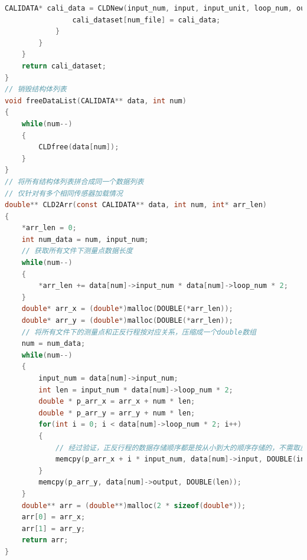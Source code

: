 \documentclass[a4paper,12pt,twoside]{article}%
\begin{document}
\begin{lstlisting}[language=C]
				CALIDATA* cali_data = CLDNew(input_num, input, input_unit, loop_num, output_unit, output);
				cali_dataset[num_file] = cali_data;
			}
		}
	}
	return cali_dataset;
}
// 销毁结构体列表
void freeDataList(CALIDATA** data, int num)
{
	while(num--)
	{
		CLDfree(data[num]);
	}
}
// 将所有结构体列表拼合成同一个数据列表
// 仅针对有多个相同传感器加载情况
double** CLD2Arr(const CALIDATA** data, int num, int* arr_len)
{
	*arr_len = 0;
	int num_data = num, input_num;
	// 获取所有文件下测量点数据长度
	while(num--)
	{
		*arr_len += data[num]->input_num * data[num]->loop_num * 2;
	}
	double* arr_x = (double*)malloc(DOUBLE(*arr_len));
	double* arr_y = (double*)malloc(DOUBLE(*arr_len));
	// 将所有文件下的测量点和正反行程按对应关系，压缩成一个double数组
	num = num_data;
	while(num--)
	{	
		input_num = data[num]->input_num;
		int len = input_num * data[num]->loop_num * 2;
		double * p_arr_x = arr_x + num * len;
		double * p_arr_y = arr_y + num * len;
		for(int i = 0; i < data[num]->loop_num * 2; i++)
		{	
			// 经过验证，正反行程的数据存储顺序都是按从小到大的顺序存储的，不需取反顺序
			memcpy(p_arr_x + i * input_num, data[num]->input, DOUBLE(input_num));
		}
		memcpy(p_arr_y, data[num]->output, DOUBLE(len));
	}
	double** arr = (double**)malloc(2 * sizeof(double*));
	arr[0] = arr_x;
	arr[1] = arr_y;
	return arr;
}
\end{lstlisting}
\end{document}
